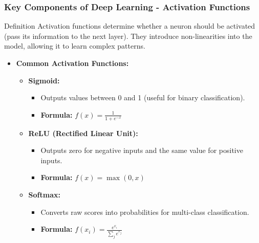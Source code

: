 \documentclass[aspectratio=169]{beamer}
\begin{document}
\begin{frame}[fragile]
    \frametitle{Key Components of Deep Learning - Activation Functions}
    \begin{block}{Definition}
        Activation functions determine whether a neuron should be activated (pass its information to the next layer). They introduce non-linearities into the model, allowing it to learn complex patterns.
    \end{block}

    \begin{itemize}
        \item \textbf{Common Activation Functions:}
        \begin{itemize}
            \item \textbf{Sigmoid:} 
                \begin{itemize}
                    \item Outputs values between 0 and 1 (useful for binary classification).
                    \item \textbf{Formula:} \( f(x) = \frac{1}{1 + e^{-x}} \)
                \end{itemize}
            \item \textbf{ReLU (Rectified Linear Unit):} 
                \begin{itemize}
                    \item Outputs zero for negative inputs and the same value for positive inputs.
                    \item \textbf{Formula:} \( f(x) = \max(0, x) \)
                \end{itemize}
            \item \textbf{Softmax:} 
                \begin{itemize}
                    \item Converts raw scores into probabilities for multi-class classification.
                    \item \textbf{Formula:} \( f(x_i) = \frac{e^{x_i}}{\sum_{j} e^{x_j}} \)
                \end{itemize}
        \end{itemize}
    \end{itemize}
\end{frame}
\end{document}
